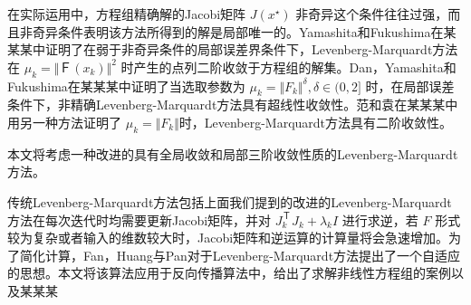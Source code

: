 在实际运用中，方程组精确解的Jacobi矩阵 $J(x^\star)$ 非奇异这个条件往往过强，而且非奇异条件表明该方法所得到的解是局部唯一的。Yamashita和Fukushima在某某某中证明了在弱于非奇异条件的局部误差界条件下，Levenberg-Marquardt方法在 $\mu_k = \Vert Ｆ(x_k)\Vert^2$ 时产生的点列二阶收敛于方程组的解集。Dan，Yamashita和Fukushima在某某某中证明了当选取参数为 $\mu_k = \Vert F_k \Vert^\delta, \delta \in (0, 2]$ 时，在局部误差条件下，非精确Levenberg-Marquardt方法具有超线性收敛性。范和袁在某某某中用另一种方法证明了 $\mu_k = \Vert F_k\Vert$时，Levenberg-Marquardt方法具有二阶收敛性。


本文将考虑一种改进的具有全局收敛和局部三阶收敛性质的Levenberg-Marquardt方法。


传统Levenberg-Marquardt方法包括上面我们提到的改进的Levenberg-Marquardt方法在每次迭代时均需要更新Jacobi矩阵，并对 $J_k^{\mathrm{Ｔ}} J_k + \lambda_k I$ 进行求逆，若 $F$ 形式较为复杂或者输入的维数较大时，Jacobi矩阵和逆运算的计算量将会急速增加。为了简化计算，Fan，Huang与Pan对于Levenberg-Marquardt方法提出了一个自适应的思想。本文将该算法应用于反向传播算法中，给出了求解非线性方程组的案例以及某某某
